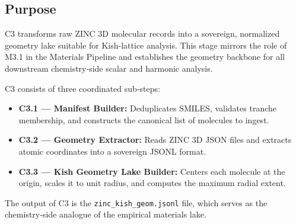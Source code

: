 \documentclass[11pt, letterpaper, openany]{book}
\begin{document}
\subsection*{Purpose}
C3 transforms raw ZINC 3D molecular records into a sovereign, normalized geometry
lake suitable for Kish‑lattice analysis. This stage mirrors the role of M3.1 in
the Materials Pipeline and establishes the geometry backbone for all downstream
chemistry‑side scalar and harmonic analysis.

C3 consists of three coordinated sub‑steps:

\begin{itemize}
    \item \textbf{C3.1 — Manifest Builder:} Deduplicates SMILES, validates tranche
          membership, and constructs the canonical list of molecules to ingest.
    \item \textbf{C3.2 — Geometry Extractor:} Reads ZINC 3D JSON files and extracts
          atomic coordinates into a sovereign JSONL format.
    \item \textbf{C3.3 — Kish Geometry Lake Builder:} Centers each molecule at the
          origin, scales it to unit radius, and computes the maximum radial extent.
\end{itemize}

The output of C3 is the \texttt{zinc\_kish\_geom.jsonl} file, which serves as the
chemistry‑side analogue of the empirical materials lake.
\end{document}
